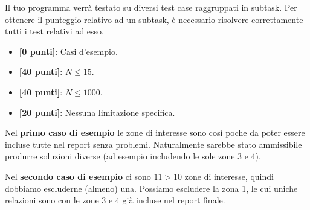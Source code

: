 \Scoring
Il tuo programma verrà testato su diversi test case raggruppati in subtask.
Per ottenere il punteggio relativo ad un subtask, è necessario risolvere
correttamente tutti i test relativi ad esso.
\begin{itemize}[nolistsep,itemsep=2mm]
\item \textbf{ [\phantom{0}0 punti]}: Casi d'esempio.
\item \textbf{ [40 punti]}: $N \le 15$.
\item \textbf{ [40 punti]}: $N \le 1000$.
\item \textbf{ [20 punti]}: Nessuna limitazione specifica.
\end{itemize}

\Examples
\begin{example}
%
%
\end{example}

\Explanation

Nel \textbf{primo caso di esempio} le zone di interesse sono così poche da poter essere incluse tutte nel report senza problemi. Naturalmente sarebbe stato ammissibile produrre soluzioni diverse (ad esempio includendo le sole zone 3 e 4).


Nel \textbf{secondo caso di esempio} ci sono $11 > 10$ zone di interesse, quindi dobbiamo escluderne (almeno) una. Possiamo escludere la zona 1, le cui uniche relazioni sono con le zone 3 e 4 già incluse nel report finale.


